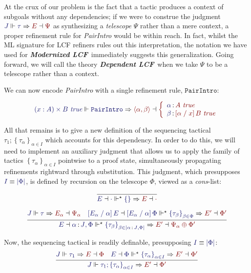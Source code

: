 \documentclass[11pt]{article}
\theoremstyle{definition}
\theoremstyle{remark}
\numberwithin{equation}{section}
\def\InputModeColorName{MidnightBlue}
\def\OutputModeColorName{Maroon}
\newcommand\InputMode[1]{{\color{\InputModeColorName}{#1}}}
\newcommand\OutputMode[1]{{\color{\OutputModeColorName}{#1}}}
\newcommand\JJ{J}
\newcommand\Tuple[1]{\left\langle#1\right\rangle}
\newcommand\MkSet[1]{\left\{#1\right\}}
\newcommand\MkFam[3]{\MkSet{#1_{#2}}_{#2\in #3}}
\newcommand\ISG[2]{\InputMode{#1}\,{\color{Black}:}\,\InputMode{#2}}
\newcommand\OSG[2]{\InputMode{#1}\,{\color{Black}:}\,\OutputMode{#2}}
\newcommand\Refine[4]{\InputMode{#1}\Vdash\InputMode{#2}\Rightarrow\OutputMode{#4}\dashv\OutputMode{#3}}
\newcommand\ThenMultiAux[5]{%
  \InputMode{#2}\dashv\InputMode{#3}%
  \Vdash^\star\InputMode{#1}\Rightarrow%
  \OutputMode{#4}\dashv\OutputMode{#5}%
}
\newcommand\IsTrueUnmoded[1]{#1\ \textit{true}}
\newcommand\ThenTac[2]{#1;#2}
\newcommand\DProdIntroRuleNullary{\mathtt{PairIntro}}
\newcommand\TyDProd[3]{(#2:#1) \times #3}
\newcommand\Dom[1]{\left\vert#1\right\vert}
\newcommand\Subst[3]{\left[#1\;/\;#2\right]#3}
\newcommand\ModLCF{\textbf{\emph{Modernized LCF}}}
\newcommand\DepLCF{\textbf{\emph{Dependent LCF}}}
\newcommand\IsEquiv[2]{\InputMode{#1}\equiv\InputMode{#2}}
\begin{document}
At the crux of our problem is the fact that a tactic produces a context of subgoals
without any dependencies; if we were to construe the judgment
$\Refine{\JJ}{\tau}{\Psi}{E}$ as synthesizing a \emph{telescope} $\Psi$ rather
than a mere context, a proper refinement rule for \emph{PairIntro} would be
within reach. In fact, whilst the ML signature for LCF refiners rules out this
interpretation, the notation we have used for \ModLCF\ immediately suggests
this generalization. Going forward, we will call the theory \DepLCF\ when we
take $\Psi$ to be a telescope rather than a context.

We can now encode \emph{PairIntro} with a single refinement rule,
$\DProdIntroRuleNullary$:

\[
  \Refine{\IsTrueUnmoded{\TyDProd{A}{x}{B}}}{\DProdIntroRuleNullary}{%
    \left\{\begin{array}{l}
        \OSG{\alpha}{\IsTrueUnmoded{A}}\\
        \OSG{\beta}{\IsTrueUnmoded{\Subst{\alpha}{x}{B}}}
    \end{array}\right.
  }{
    \Tuple{\alpha,\beta}
  }
\]

All that remains is to give a new definition of the sequencing tactical
$\ThenTac{\tau_1}{\MkFam{\tau}{\alpha}{I}}$ which accounts for this dependency.
In order to do this, we will need to implement an auxiliary judgment
\framebox{$\ThenMultiAux{\MkFam{\tau}{\alpha}{I}}{E}{\Phi}{E'}{\Phi'}$} that
allows us to apply the family of tactics $\MkFam{\tau}{\alpha}{I}$ pointwise to
a proof state, simultaneously propagating refinements rightward through
substitution. This judgment, which presupposes $\IsEquiv{I}{\Dom\Phi}$, is defined
by recursion on the telescope $\Phi$, viewed as a \emph{cons}-list:

\begin{gather*}
  \infer{
    \ThenMultiAux{\MkSet{}}{E}{\cdot}{E}{\cdot}
  }{
  }\\[6pt]
  \infer{
    \ThenMultiAux{
      \MkFam{\tau}{\beta}{\Dom{\ISG{\alpha}{\JJ},\Phi}}
    }{E}{
      \ISG{\alpha}{\JJ},\Phi
    }{E'}{
      \Psi_\alpha\oplus\Phi'
    }
  }{
    \Refine{\JJ}{\tau}{\Psi_\alpha}{E_\alpha} &
    \ThenMultiAux{
      \MkFam{\tau}{\beta}{\Phi}
    }{
      \Subst{E_\alpha}{\alpha}{E}%
    }{
      \Subst{E_\alpha}{\alpha}{\Phi}
    }{E'}{\Phi'}
  }
\end{gather*}

Now, the sequencing tactical is readily definable, presupposing $\IsEquiv{I}{\Dom\Phi}$:
\[
  \infer{
    \Refine{\JJ}{\ThenTac{\tau_1}{\MkFam{\tau}{\alpha}{I}}}{\Phi'}{E'}
  }{
    \Refine{\JJ}{\tau_1}{\Phi}{E} &
    \ThenMultiAux{
      \MkFam{\tau}{\alpha}{I}
    }{E}{\Phi}{E'}{\Phi'}
  }
\]

\end{document}
